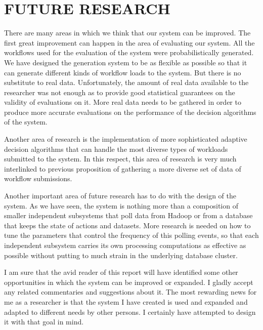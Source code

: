 \chapter{FUTURE RESEARCH}
\label{chap:future}
There are many areas in which we think that our system can be improved. The first great improvement can happen in the area of evaluating our system. All the workflows used for the evaluation of the system were probabilistically generated.  We have designed the generation system to be as flexible as possible so that it can generate different kinds of workflow loads to the system.  But there is no substitute to real data. Unfortunately, the amount of real data available to the researcher was not enough as to provide good statistical guarantees on the validity of evaluations on it. More real data needs to be gathered in order to produce more accurate evaluations on the performance of the decision algorithms of the system.

Another area of research is the implementation of more sophisticated adaptive decision algorithms that can handle the most diverse types of workloads submitted to the system.  In this respect, this area of research is very much interlinked to previous proposition of gathering a more diverse set of data of workflow submissions. 

Another important area of future research has to do with the design of the system. As we have seen, the system is nothing more than a composition of smaller independent subsystems that poll data from Hadoop or from a database that keeps the state of actions and datasets.  More research is needed on how to tune the parameters that control the frequency of this polling events, so that each independent subsystem carries its own processing computations as effective as possible without putting to much strain in the underlying database cluster.

I am sure that the avid reader of this report will have identified some other opportunities in which the system can be improved or expanded. I gladly accept any related commentaries and suggestions about it. The most rewarding news for me as a researcher is that the system I have created is used and expanded and adapted to different needs by other persons. I certainly have attempted to design it with that goal in mind.